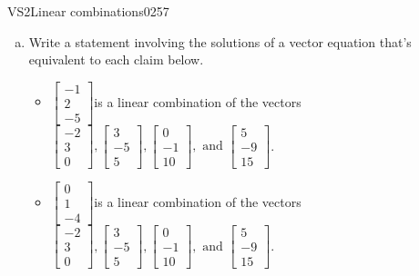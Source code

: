 \begin{exercise}{VS2}{Linear combinations}{0257} 
\begin{exerciseStatement} 

\begin{enumerate}[(a)]
\item  

 Write a statement involving the solutions of a vector equation that's equivalent to each claim below. 

 

\begin{itemize}
\item  

 \(\left[\begin{array}{c}
-1 \\
2 \\
-5
\end{array}\right]\)is a linear combination of the vectors \(\left[\begin{array}{c}
-2 \\
3 \\
0
\end{array}\right] , \left[\begin{array}{c}
3 \\
-5 \\
5
\end{array}\right] , \left[\begin{array}{c}
0 \\
-1 \\
10
\end{array}\right] , \text{ and } \left[\begin{array}{c}
5 \\
-9 \\
15
\end{array}\right]\). 

 
\item  

 \(\left[\begin{array}{c}
0 \\
1 \\
-4
\end{array}\right]\)is a linear combination of the vectors \(\left[\begin{array}{c}
-2 \\
3 \\
0
\end{array}\right] , \left[\begin{array}{c}
3 \\
-5 \\
5
\end{array}\right] , \left[\begin{array}{c}
0 \\
-1 \\
10
\end{array}\right] , \text{ and } \left[\begin{array}{c}
5 \\
-9 \\
15
\end{array}\right]\). 


\end{itemize}
\end{enumerate}
\end{exerciseStatement}
\end{exercise}
